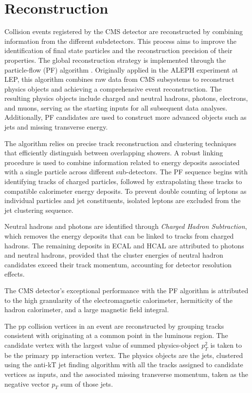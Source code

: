 \chapter{Reconstruction}

Collision events registered by the CMS detector are reconstructed by combining information from the different subdetectors.
This process aims to improve the identification of final state particles and the reconstruction precision of their properties.
The global reconstruction strategy is implemented through the particle-flow (PF) algorithm \cite{ParticleFlow}.
Originally applied in the ALEPH experiment at LEP, this algorithm combines raw data from CMS subsystems to reconstruct physics objects and achieving a comprehensive event reconstruction.
The resulting physics objects include charged and neutral hadrons, photons, electrons, and muons, serving as the starting inputs for all subsequent data analyses.
Additionally, PF candidates are used to construct more advanced objects such as jets and missing transverse energy.

The algorithm relies on precise track reconstruction and clustering techniques that efficiently distinguish between overlapping showers.
A robust linking procedure is used to combine information related to energy deposits associated with a single particle across different sub-detectors.
The PF sequence begins with identifying tracks of charged particles, followed by extrapolating these tracks to compatible calorimeter energy deposits.
To prevent double counting of leptons as individual particles and jet constituents, isolated leptons are excluded from the jet clustering sequence.

Neutral hadrons and photons are identified through \textit{Charged Hadron Subtraction}, which removes the energy deposits that can be linked to tracks from charged hadrons.
The remaining deposits in ECAL and HCAL are attributed to photons and neutral hadrons,
provided that the cluster energies of neutral hadron candidates exceed their track momentum, accounting for detector resolution effects.

The CMS detector's exceptional performance with the PF algorithm is attributed to the high granularity of the electromagnetic calorimeter, hermiticity of the hadron calorimeter, and a large magnetic field integral.

The pp collision vertices in an event are reconstructed by grouping tracks consistent with originating at a common point in the luminous region.
The candidate vertex with the largest value of summed physics-object $p^2_T$ is taken to be the primary pp interaction vertex.
The physics objects are the jets, clustered using the anti-kT jet finding algorithm \cite{Cacciari:2008gp, Cacciari:2011ma} with all the tracks assigned to candidate vertices as inputs,
and the associated missing transverse momentum, taken as the negative vector $p_T$ sum of those jets.

